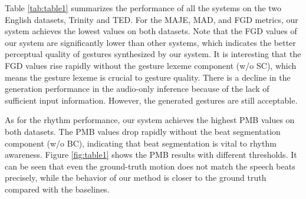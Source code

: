 Table \ref{tab:table1} summarizes the performance of all the systems on the two English datasets, Trinity and TED. For the MAJE, MAD, and FGD metrics, our system achieves the lowest values on both datasets. Note that the FGD values of our system are significantly lower than other systems, which indicates the better perceptual quality of gestures synthesized by our system. It is interesting that the FGD values rise rapidly without the gesture lexeme component (w/o SC), which means the gesture lexeme is crucial to gesture quality. There is a decline in the generation performance in the audio-only inference because of the lack of sufficient input information. However, the generated gestures are still acceptable.

As for the rhythm performance, our system achieves the highest PMB values on both datasets. The PMB values drop rapidly without the beat segmentation component (w/o BC), indicating that beat segmentation is vital to rhythm awareness. Figure \ref{fig:table1} shows the PMB results with different thresholds. It can be seen that even the ground-truth motion does not match the speech beats precisely, while the behavior of our method is closer to the ground truth compared  with the baselines.

